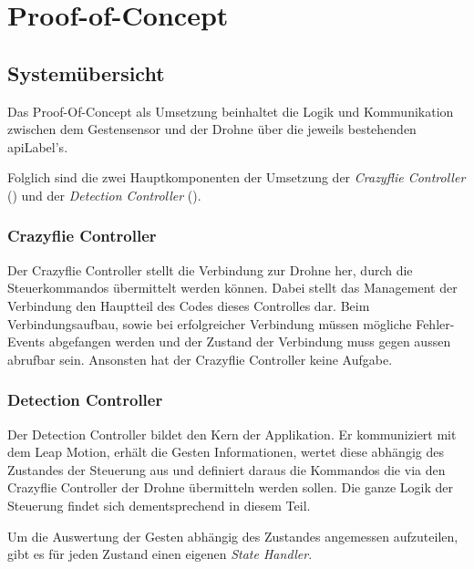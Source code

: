 \chapter{Proof-of-Concept}

\section{Systemübersicht}
Das Proof-Of-Concept als Umsetzung beinhaltet die Logik und Kommunikation zwischen dem Gestensensor und der Drohne über die jeweils bestehenden \gls{apiLabel}'s.

Folglich sind die zwei Hauptkomponenten der Umsetzung der \textit{Crazyflie Controller} () und der \textit{Detection Controller} ().

\subsection{Crazyflie Controller}
\label{sec:poc:controllerCrazyflie}
Der Crazyflie Controller stellt die Verbindung zur Drohne her, durch die Steuerkommandos übermittelt werden können.
Dabei stellt das Management der Verbindung den Hauptteil des Codes dieses Controlles dar.
Beim Verbindungsaufbau, sowie bei erfolgreicher Verbindung müssen mögliche Fehler-Events abgefangen werden und der Zustand der Verbindung muss gegen aussen abrufbar sein.
Ansonsten hat der Crazyflie Controller keine Aufgabe.

\subsection{Detection Controller}
\label{sec:poc:controllerDetection}
Der Detection Controller bildet den Kern der Applikation. Er kommuniziert mit dem Leap Motion, erhält die Gesten Informationen, wertet diese abhängig des Zustandes der Steuerung aus und definiert daraus die Kommandos die via den Crazyflie Controller der Drohne übermitteln werden sollen.
Die ganze Logik der Steuerung findet sich dementsprechend in diesem Teil.

Um die Auswertung der Gesten abhängig des Zustandes angemessen aufzuteilen, gibt es für jeden Zustand einen eigenen \textit{State Handler}.

\clearpage

